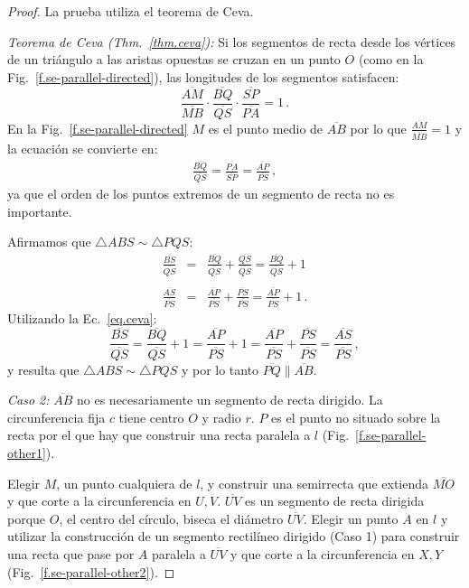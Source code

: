 \begin{proof}
La prueba utiliza el teorema de Ceva.

\textit{Teorema de Ceva  (Thm.~\ref{thm.ceva}):}
Si los segmentos de recta desde los vértices de un triángulo a las aristas opuestas se cruzan en un punto $O$ (como en la Fig.~\ref{f.se-parallel-directed}), las longitudes de los segmentos satisfacen:
\[
\frac{\overline{AM}}{\overline{MB}}\cdot\frac{\overline{BQ}}{\overline{QS}}\cdot\frac{\overline{SP}}{\overline{PA}} = 1\,.
\]
En la Fig.~\ref{f.se-parallel-directed} $M$ es el punto medio de $\overline{AB}$ por lo que $\displaystyle\frac{\overline{AM}}{\overline{MB}}=1$ y la ecuación se convierte en:
\begin{align}
\frac{\overline{BQ}}{\overline{QS}}=\frac{\overline{PA}}{\overline{SP}}=\frac{\overline{AP}}{\overline{PS}}\,,\label{eq.ceva}
\end{align}
ya que el orden de los puntos extremos de un segmento de recta no es importante.

Afirmamos que $\triangle ABS \sim \triangle PQS$:
\begin{eqnarray*}
\frac{\overline{BS}}{\overline{QS}}&=&\frac{\overline{BQ}}{\overline{QS}}+\frac{\overline{QS}}{\overline{QS}} = \frac{\overline{BQ}}{\overline{QS}}+1\\
&&\\
\frac{\overline{AS}}{\overline{PS}} &=& \frac{\overline{AP}}{\overline{PS}} + \frac{\overline{PS}}{\overline{PS}} = \frac{\overline{AP}}{\overline{PS}} + 1\,.
\end{eqnarray*}
Utilizando la Ec.~\ref{eq.ceva}:
\[
\frac{\overline{BS}}{\overline{QS}}=\frac{\overline{BQ}}{\overline{QS}}+1=\frac{\overline{AP}}{\overline{PS}}+1=\frac{\overline{AP}}{\overline{PS}}+\frac{\overline{PS}}{\overline{PS}}=\frac{\overline{AS}}{\overline{PS}}\,,
\]
y resulta que $\triangle ABS \sim \triangle PQS$ y por lo tanto $\overline{PQ}\parallel\overline{AB}$.

\textit{Caso 2:}
$\overline{AB}$ no es necesariamente un segmento de recta dirigido. La circunferencia fija $c$ tiene centro $O$ y radio $r$. $P$ es el punto no situado sobre la recta por el que hay que construir una recta paralela a $l$ (Fig.~\ref{f.se-parallel-other1}).

Elegir $M$, un punto cualquiera de $l$, y construir una semirrecta que extienda $\overline{MO}$ y que corte a la circunferencia en $U,V$.
$\overline{UV}$ es un segmento de recta dirigida porque $O$, el centro del círculo, biseca el diámetro $\overline{UV}$. Elegir un punto $A$ en $l$ y utilizar la construcción de un segmento rectilíneo dirigido (Caso 1) para construir una recta que pase por $A$ paralela a $\overline{UV}$ y que corte a la circunferencia en $X,Y$ (Fig.~\ref{f.se-parallel-other2}).


\end{proof}
